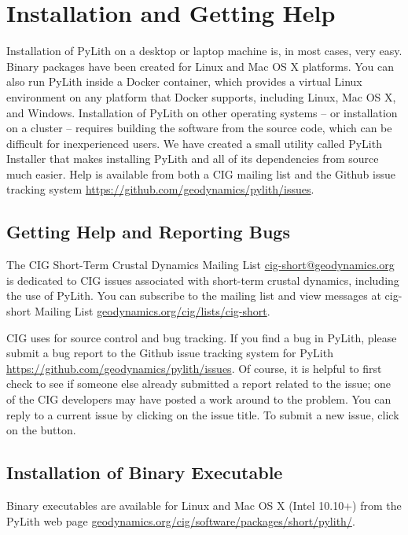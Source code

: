 \chapter{Installation and Getting Help}
\label{sec:installation}

Installation of PyLith on a desktop or laptop machine is, in most
cases, very easy. Binary packages have been created for Linux and Mac
OS X platforms. You can also run PyLith inside a Docker container,
which provides a virtual Linux environment on any platform that Docker
supports, including Linux, Mac OS X, and Windows. Installation of
PyLith on other operating systems -- or installation on a cluster --
requires building the software from the source code, which can be
difficult for inexperienced users. We have created a small utility
called PyLith Installer that makes installing PyLith and all of its
dependencies from source much easier. Help is available from both a
CIG mailing list and the Github issue tracking system
\url{https://github.com/geodynamics/pylith/issues}.


\section{Getting Help and Reporting Bugs}
\label{sec:help:bugs}

The CIG Short-Term Crustal Dynamics Mailing List
\url{cig-short@geodynamics.org} is dedicated to CIG issues associated
with short-term crustal dynamics, including the use of PyLith. You can
subscribe to the mailing list and view messages at cig-short Mailing
List \url{geodynamics.org/cig/lists/cig-short}.

CIG uses  for source control and bug tracking. If you
find a bug in PyLith, please submit a bug report to the Github issue
tracking system for PyLith \url{https://github.com/geodynamics/pylith/issues}.
Of course, it is helpful to first check to see if someone else already
submitted a report related to the issue; one of the CIG developers
may have posted a work around to the problem. You can reply to a current
issue by clicking on the issue title. To submit a new issue, click
on the  button.


\section{Installation of Binary Executable}

Binary executables are available for Linux and Mac OS X (Intel 10.10+)
from the PyLith web page
\url{geodynamics.org/cig/software/packages/short/pylith/}.


